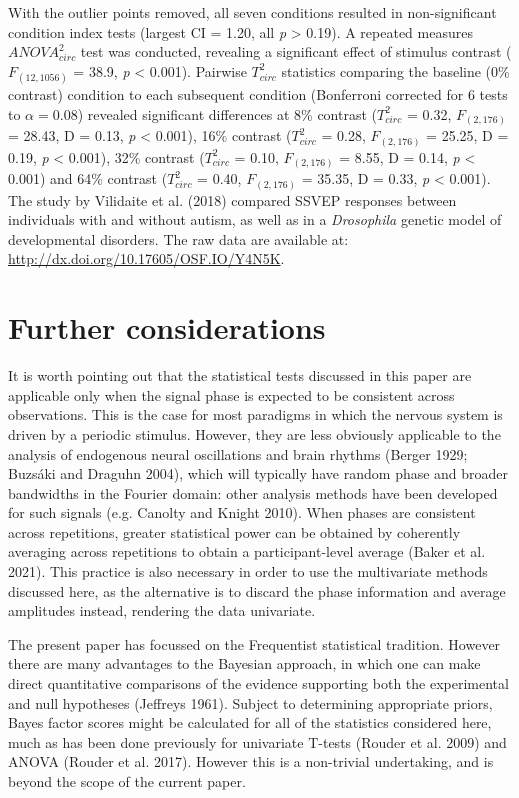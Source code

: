 \documentclass[]{article}
\begin{document}
With the outlier points removed, all seven conditions resulted in non-significant condition index tests (largest CI = 1.20, all \emph{p} \textgreater{} 0.19). A repeated measures \(ANOVA^2_{circ}\) test was conducted, revealing a significant effect of stimulus contrast (\(F_{(12,1056)}\) = 38.9, \emph{p} \textless{} 0.001). Pairwise \(T^2_{circ}\) statistics comparing the baseline (0\% contrast) condition to each subsequent condition (Bonferroni corrected for 6 tests to \(\alpha = 0.08\)) revealed significant differences at 8\% contrast (\(T^2_{circ}\) = 0.32, \(F_{(2,176)}\) = 28.43, D = 0.13, \emph{p} \textless{} 0.001), 16\% contrast (\(T^2_{circ}\) = 0.28, \(F_{(2,176)}\) = 25.25, D = 0.19, \emph{p} \textless{} 0.001), 32\% contrast (\(T^2_{circ}\) = 0.10, \(F_{(2,176)}\) = 8.55, D = 0.14, \emph{p} \textless{} 0.001) and 64\% contrast (\(T^2_{circ}\) = 0.40, \(F_{(2,176)}\) = 35.35, D = 0.33, \emph{p} \textless{} 0.001). The study by Vilidaite et al. (2018) compared SSVEP responses between individuals with and without autism, as well as in a \emph{Drosophila} genetic model of developmental disorders. The raw data are available at: \url{http://dx.doi.org/10.17605/OSF.IO/Y4N5K}.

\hypertarget{further-considerations}{%
\section{Further considerations}\label{further-considerations}}

It is worth pointing out that the statistical tests discussed in this paper are applicable only when the signal phase is expected to be consistent across observations. This is the case for most paradigms in which the nervous system is driven by a periodic stimulus. However, they are less obviously applicable to the analysis of endogenous neural oscillations and brain rhythms (Berger 1929; Buzsáki and Draguhn 2004), which will typically have random phase and broader bandwidths in the Fourier domain: other analysis methods have been developed for such signals (e.g. Canolty and Knight 2010). When phases are consistent across repetitions, greater statistical power can be obtained by coherently averaging across repetitions to obtain a participant-level average (Baker et al. 2021). This practice is also necessary in order to use the multivariate methods discussed here, as the alternative is to discard the phase information and average amplitudes instead, rendering the data univariate.

The present paper has focussed on the Frequentist statistical tradition. However there are many advantages to the Bayesian approach, in which one can make direct quantitative comparisons of the evidence supporting both the experimental and null hypotheses (Jeffreys 1961). Subject to determining appropriate priors, Bayes factor scores might be calculated for all of the statistics considered here, much as has been done previously for univariate T-tests (Rouder et al. 2009) and ANOVA (Rouder et al. 2017). However this is a non-trivial undertaking, and is beyond the scope of the current paper.
\end{document}
